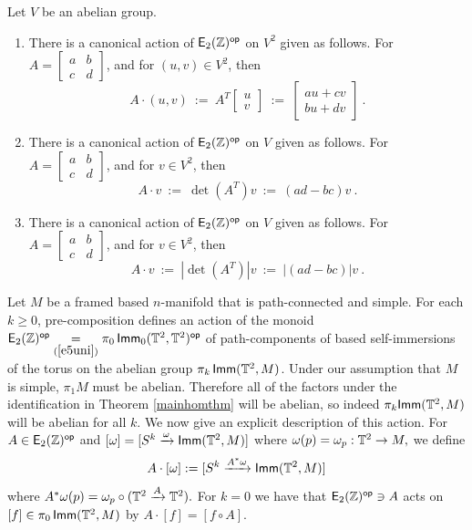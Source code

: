 \begin{observation}
\label{t10uni}
Let $V$ be an abelian group.  
\begin{enumerate}
\item
There is a canonical action of ${\sf E}_2(\mathbb Z)^{\operatorname{\mathsf{op}}}$ on $V^2$ given as follows.
For $A = \begin{bmatrix} a & b \\ c & d \end{bmatrix}$, and for $(u,v)\in V^2$, then 
\[
A \cdot (u,v)
~:=~
A^T 
\begin{bmatrix}
u
\\
v
\end{bmatrix}
~:=~
\begin{bmatrix}
au + cv 
\\
bu + dv
\end{bmatrix}
~.
\]


\item
There is a canonical action of ${\sf E}_2(\mathbb Z)^{\operatorname{\mathsf{op}}}$ on $V$ given as follows.
For $A = \begin{bmatrix} a & b \\ c & d \end{bmatrix}$, and for $v \in V^2$, then 
\[
A \cdot v
~:=~
\det(A^T) 
v
~:=~
(ad-bc) v
~.
\]


\item
There is a canonical action of ${\sf E}_2(\mathbb Z)^{\operatorname{\mathsf{op}}}$ on $V$ given as follows.
For $A = \begin{bmatrix} a & b \\ c & d \end{bmatrix}$, and for $v \in V^2$, then 
\[
A \cdot v
~:=~
| \det(A^T) |
v
~:=~
|(ad-bc)| v
~.
\]



\end{enumerate}

\end{observation}

\begin{observation} \label{sobs}

Let $M$ be a framed based $n$-manifold that is path-connected and simple. 
For each $k\geq 0$, pre-composition defines an action of the monoid $\mathsf E_2(\mathbb Z)^{\operatorname{\mathsf{op}}} \underset{(\ref{e5uni})}= \pi_0\operatorname{\sf Imm}_0(\mathbb T^2,\mathbb T^2)^{\operatorname{\mathsf{op}}}$ of path-components of based self-immersions of the torus on the abelian group $\pi_k\operatorname{\sf Imm}(\mathbb T^2 , M)$. 
Under our assumption that $M$ is simple, $\pi_{1}M$ must be abelian. Therefore all of the factors under the identification in Theorem \ref{mainhomthm} will be abelian, so indeed $\pi_{k}{\sf Imm}(\mathbb T^{2}, M)$ will be abelian for all $k.$
We now give an explicit description of this action. For $A \in \mathsf E_2(\mathbb Z)^{\operatorname{\mathsf{op}}}$ and $[\omega] = [S^{k} \xrightarrow{\omega} {\sf Imm}(\mathbb T^{2}, M)]$ where $\omega(p) = \omega_{p}: \mathbb T^{2} \rightarrow M,$ we define
\[
A \cdot [\omega] := [S^{k} \xrightarrow{A^{\ast}\omega} {\sf Imm}(\mathbb T^{2}, M)]
\]
where $A^{\ast}\omega(p) = \omega_{p} \circ (\mathbb T^{2} \xrightarrow{A} \mathbb T^{2}).$ For $k = 0$ we have that $\mathsf E_2(\mathbb Z)^{\operatorname{\mathsf{op}}} \ni A$ acts on $[f] \in \pi_{0}\operatorname{\sf Imm}(\mathbb T^2 , M)$ by $A \cdot [f] = [f \circ A].$

\end{observation}


